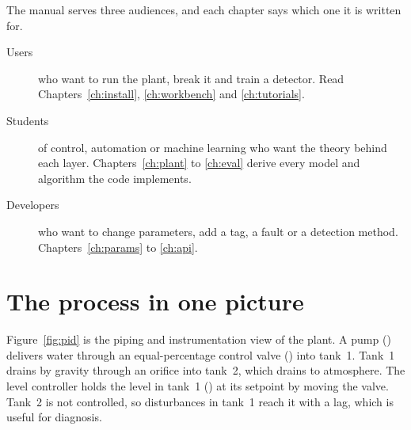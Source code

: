 The manual serves three audiences, and each chapter says which one it is
written for.

\begin{description}
  \item[Users] who want to run the plant, break it and train a detector.
        Read Chapters~\ref{ch:install}, \ref{ch:workbench} and
        \ref{ch:tutorials}.
  \item[Students] of control, automation or machine learning who want the
        theory behind each layer. Chapters~\ref{ch:plant} to \ref{ch:eval}
        derive every model and algorithm the code implements.
  \item[Developers] who want to change parameters, add a tag, a fault or a
        detection method. Chapters~\ref{ch:params} to \ref{ch:api}.
\end{description}

\section{The process in one picture}

Figure~\ref{fig:pid} is the piping and instrumentation view of the plant. A
pump () delivers water through an equal-percentage control valve
() into tank~1. Tank~1 drains by gravity through an orifice into
tank~2, which drains to atmosphere. The level controller  holds the
level in tank~1 () at its setpoint by moving the valve. Tank~2 is not
controlled, so disturbances in tank~1 reach it with a lag, which is useful for
diagnosis.

